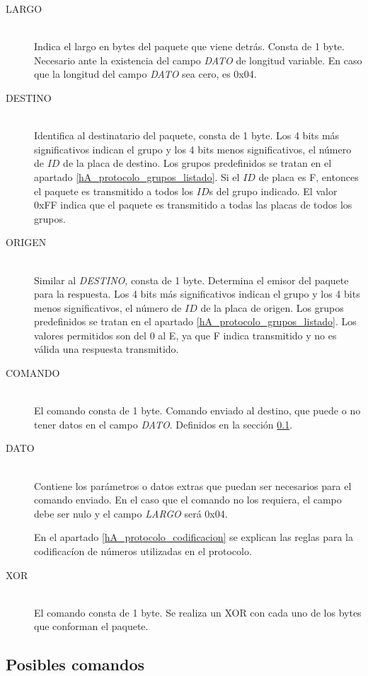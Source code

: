 \begin{description}
  \item[LARGO] \hfill \\
	Indica el largo en bytes del paquete que viene detr\'as.
Consta de 1 byte.
	Necesario ante la existencia del campo \emph{DATO} de longitud variable.
	En caso que la longitud del campo \emph{DATO} sea cero, es 0x04.
  \item[DESTINO] \hfill \\
	Identifica al destinatario del paquete, consta de 1 byte.
	Los 4 bits m\'as significativos indican el grupo y los 4 bits menos significativos, el n\'umero de $ID$ de la placa de destino.
	Los grupos predefinidos se tratan en el apartado \ref{hA_protocolo_grupos_listado}.
	Si el $ID$ de placa es F, entonces el paquete es transmitido a todos los $ID$s del grupo indicado.
	El valor 0xFF indica que el paquete es transmitido a todas las placas de todos los grupos.
  \item[ORIGEN] \hfill \\
	Similar al \emph{DESTINO}, consta de 1 byte.
	Determina el emisor del paquete para la respuesta.
	Los 4 bits m\'as significativos indican el grupo y los 4 bits menos significativos, el n\'umero de $ID$ de la placa de origen.
	Los grupos predefinidos se tratan en el apartado \ref{hA_protocolo_grupos_listado}.
	Los valores permitidos son del 0 al E, ya que F indica transmitido y no es v\'alida una respuesta transmitido.
  \item[COMANDO] \hfill \\
	El comando consta de 1 byte.
	Comando enviado al destino, que puede o no tener datos en el campo \emph{DATO}.
	Definidos en la secci\'on \ref{hA_protocolo_comandos}.
  \item[DATO] \hfill \\
	Contiene los par\'ametros o datos extras que puedan ser necesarios para el comando enviado.
	En el caso que el comando no los requiera, el campo debe ser nulo y el campo \emph{LARGO} ser\'a 0x04.

	En el apartado \ref{hA_protocolo_codificacion} se explican las reglas para la codificac\'ion de n\'umeros utilizadas en el protocolo.
  \item[XOR] \hfill \\
	El comando consta de 1 byte.
	Se realiza un XOR con cada uno de los bytes que conforman el paquete.
\end{description}

\subsection{Posibles comandos}
\label{hA_protocolo_comandos}

